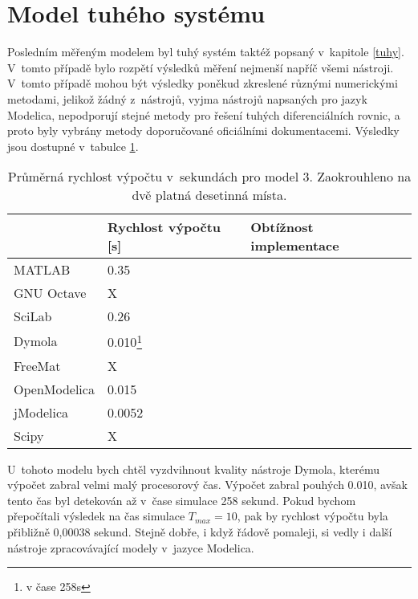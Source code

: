 \section{Model tuhého systému}
\label{srovnani-tuhy}
Posledním měřeným modelem byl tuhý systém taktéž popsaný v~kapitole \ref{tuhy}. V~tomto případě bylo rozpětí výsledků měření nejmenší napříč všemi nástroji. V~tomto případě mohou být výsledky poněkud zkreslené různými numerickými metodami, jelikož žádný z~nástrojů, vyjma nástrojů napsaných pro jazyk Modelica, nepodporují stejné metody pro řešení tuhých diferenciálních rovnic, a proto byly vybrány metody doporučované oficiálními dokumentacemi. Výsledky jsou dostupné v~tabulce \ref{tab:tuhy-tabulka}.
\begin{savenotes}
\begin{table}[ht]
\centering
\begin{tabular}{|l|l|l|}
\hline
             & Rychlost výpočtu {[}s{]} & Obtížnost implementace \\ \hline
MATLAB       &         0.35                 &  \\ \hline
GNU Octave   &             X             &  \\ \hline
SciLab       &          0.26                &  \\ \hline
Dymola       &        0.010\footnote{v čase 258s}                  &  \\ \hline
FreeMat &                 X         &  \\ \hline
OpenModelica    &     0.015                     &  \\ \hline
jModelica        &    0.0052                      &  \\ \hline
 Scipy            &      X                    &  \\ \hline
\end{tabular}
\caption{Průměrná rychlost výpočtu v~sekundách pro model 3. Zaokrouhleno na dvě platná desetinná místa.}
\label{tab:tuhy-tabulka}
\end{table}
\end{savenotes}

U~tohoto modelu bych chtěl vyzdvihnout kvality nástroje Dymola, kterému výpočet zabral velmi malý procesorový čas. Výpočet zabral pouhých 0.010, avšak tento čas byl detekován až v~čase simulace 258 sekund. Pokud bychom přepočítali výsledek na čas simulace $T_{max} = 10$, pak by rychlost výpočtu byla přibližně 0,00038 sekund. Stejně dobře, i když řádově pomaleji, si vedly i další nástroje zpracovávající modely v~jazyce Modelica.

